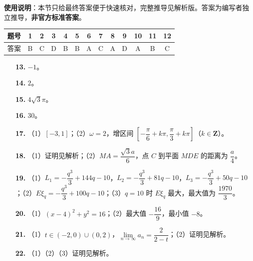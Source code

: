 
\begin{gknotice}
\textbf{使用说明}：本节只给最终答案便于快速核对，完整推导见解析版。答案为编写者独立推导，\textbf{非官方标准答案}。
\end{gknotice}

\begin{center}\begin{tabular}{ccccccccccccc}
\toprule
题号 & 1 & 2 & 3 & 4 & 5 & 6 & 7 & 8 & 9 & 10 & 11 & 12 \\
\midrule
答案 & B & C & D & B & B & A & C & A & D & A & B & C \\
\bottomrule
\end{tabular}\end{center}

\begin{itemize}[leftmargin=2.6em]
  \item[\textbf{13.}] $-1$。
  \item[\textbf{14.}] $2$。
  \item[\textbf{15.}] $4\sqrt3\pi$。
  \item[\textbf{16.}] $30$。
\end{itemize}

\begin{itemize}[leftmargin=2.6em]
  \item[\textbf{17.}] （1）$[-3,1]$；（2）$\omega=2$，增区间 $\left[-\dfrac{\pi}6+k\pi,\dfrac{\pi}3+k\pi\right]$（$k\in\mathbf Z$）。
  \item[\textbf{18.}] （1）证明见解析；（2）$MA=\dfrac{\sqrt3a}6$，点 $C$ 到平面 $MDE$ 的距离为 $\dfrac a4$。
  \item[\textbf{19.}] （1）$L_1=-\dfrac{q^3}3+144q-10$，$L_2=-\dfrac{q^3}3+81q-10$，$L_3=-\dfrac{q^3}3+50q-10$；（2）$E\xi_q=-\dfrac{q^3}3+100q-10$；（3）$q=10$ 时 $E\xi_q$ 最大，最大值为 $\dfrac{1970}3$。
  \item[\textbf{20.}] （1）$(x-4)^2+y^2=16$；（2）最大值 $-\dfrac{16}9$，最小值 $-8$。
  \item[\textbf{21.}] （1）$t\in(-2,0)\cup(0,2)$，$\lim\limits_{n\to\infty}a_n=\dfrac2{2-t}$；（2）证明见解析。
  \item[\textbf{22.}] （1）（2）（3）证明见解析。
\end{itemize}
